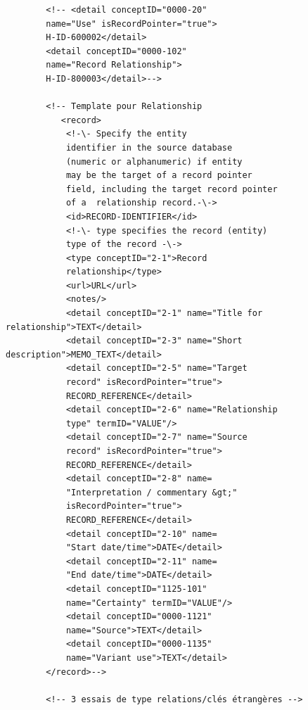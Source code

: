 \documentclass[a4paper,12pt,twoside]{book}
\begin{document}
\begin{verbatim}
        <!-- <detail conceptID="0000-20"
        name="Use" isRecordPointer="true">
        H-ID-600002</detail>
        <detail conceptID="0000-102" 
        name="Record Relationship">
        H-ID-800003</detail>-->

        <!-- Template pour Relationship
           <record>
            <!-\- Specify the entity 
            identifier in the source database
            (numeric or alphanumeric) if entity 
            may be the target of a record pointer 
            field, including the target record pointer 
            of a  relationship record.-\->
            <id>RECORD-IDENTIFIER</id>
            <!-\- type specifies the record (entity)
            type of the record -\->
            <type conceptID="2-1">Record 
            relationship</type>
            <url>URL</url>
            <notes/>
            <detail conceptID="2-1" name="Title for relationship">TEXT</detail>
            <detail conceptID="2-3" name="Short description">MEMO_TEXT</detail>
            <detail conceptID="2-5" name="Target 
            record" isRecordPointer="true">
            RECORD_REFERENCE</detail>
            <detail conceptID="2-6" name="Relationship
            type" termID="VALUE"/>
            <detail conceptID="2-7" name="Source 
            record" isRecordPointer="true">
            RECORD_REFERENCE</detail>
            <detail conceptID="2-8" name=
            "Interpretation / commentary &gt;" 
            isRecordPointer="true">
            RECORD_REFERENCE</detail>
            <detail conceptID="2-10" name=
            "Start date/time">DATE</detail>
            <detail conceptID="2-11" name=
            "End date/time">DATE</detail>
            <detail conceptID="1125-101" 
            name="Certainty" termID="VALUE"/>
            <detail conceptID="0000-1121" 
            name="Source">TEXT</detail>
            <detail conceptID="0000-1135" 
            name="Variant use">TEXT</detail>
        </record>-->

        <!-- 3 essais de type relations/clés étrangères -->
        

\end{verbatim}
\end{document}
